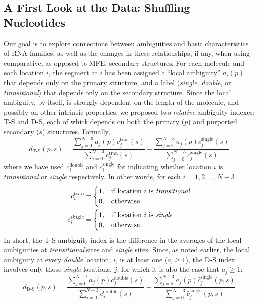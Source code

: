 \documentclass[10pt,letterpaper]{article}
\begin{document}
\subsection*{A First Look at the Data: Shuffling Nucleotides}
Our goal is to explore connections between ambiguities and basic characteristics of RNA families, as well as the changes in these relationships, if any, when using comparative, as opposed to MFE, secondary structures.
For each molecule and each location $i$, the segment at $i$ has been assigned a ``local ambiguity'' $a_i(p)$ that depends only on the primary structure, and a label ({\it single}, {\it double}, or {\it transitional}) that depends only on the secondary structure. Since the local ambiguity, by itself, is strongly dependent on the length of the molecule, and possibly on other intrinsic properties,
we proposed two {\em relative} ambiguity indexes: T-S and D-S, each of which depends on both the primary ($p$) and purported secondary ($s$) structures. Formally,
\begin{equation}
	d_\text{T-S}(p, s) = \frac
	{\sum_{j = 0}^{N - 3} a_j (p) 
	c^{\text{tran}}_j (s)}
	{\sum_{j = 0}^{N - 3} 
	c^{\text{tran}}_j (s)} - 
	\frac
	{\sum_{j = 0}^{N - 3} a_j (p) c_j^{\text{single}} (s)}
	{\sum_{j = 0}^{N - 3} c_j^{\text{single}} (s)}
\end{equation}
where we have used
$c_i^{\text{double}}$ and $c_i^{\text{single}}$ for indicating whether location $i$ is {\it transitional} or {\it single} respectively. In other words, for each $i=1,2,\ldots,N-3$
\begin{align}
	c_i^{\text{tran}} &=
	\begin{cases}
		1, & \text{if location $i$ is \textit{transitional}} \\
		0, & \text{otherwise}
	\end{cases} \\
	c_i^{\text{single}} &=
	\begin{cases}
		1, & \text{if location $i$ is \textit{single}} \\
		0, & \text{otherwise}
	\end{cases}
\end{align}
In short, the T-S ambiguity index is the difference in the averages of the local ambiguities at {\em transitional} sites and {\em single} sites.
Since, as noted earlier, the local ambiguity at every {\em double} location, $i$, is at least one ($a_i\geq 1$), the D-S index involves only those {\em single} locations, $j$, for which it is also the case that $a_j\geq 1$:
\begin{equation}
	d_\text{D-S}(p, s) = \frac
	{\sum_{j = 0}^{N - 3} a_j (p) 
	c^{\text{double}}_j (s)}
	{\sum_{j = 0}^{N - 3} 
	c^{\text{double}}_j (s)} - 
	\frac
	{\sum_{j = 0}^{N - 3} a_j (p) \hat{c}_j^{\text{single}} (p,s)}
	{\sum_{j = 0}^{N - 3} \hat{c}_j^{\text{single}} (p,s)}
\end{equation}
\end{document}
